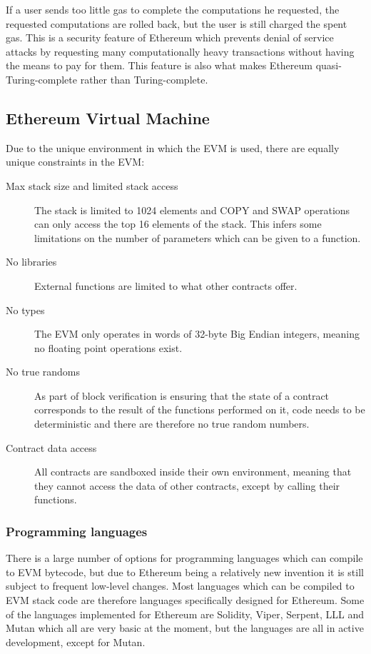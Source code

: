 \documentclass{article}
\begin{document}
		If a user sends too little gas to complete the computations he requested, the requested computations are rolled back, but the user is still charged the spent gas.
		This is a security feature of Ethereum which prevents denial of service attacks by requesting many computationally heavy transactions without having the means to pay for them. 
		This feature is also what makes Ethereum quasi-Turing-complete rather than Turing-complete.

		\subsection{Ethereum Virtual Machine}	
		\label{sec:ethereum-virtual-machine}
		Due to the unique environment in which the EVM is used, there are equally unique constraints in the EVM:
		\begin{description}
			\item [Max stack size and limited stack access] The stack is limited to 1024 elements and COPY and SWAP operations can only access the top 16 elements of the stack. This infers some limitations on the number of parameters which can be given to a function.
			\item [No libraries] External functions are limited to what other contracts offer.  
			\item [No types] The EVM only operates in words of 32-byte Big Endian integers, meaning no floating point operations exist.
			\item [No true randoms] As part of block verification is ensuring that the state of a contract corresponds to the result of the functions performed on it, code needs to be deterministic and there are therefore no true random numbers.
			\item [Contract data access] All contracts are sandboxed inside their own environment, meaning that they cannot access the data of other contracts, except by calling their functions.
		\end{description}

		\subsubsection{Programming languages}
		There is a large number of options for programming languages which can compile to EVM bytecode, but due to Ethereum being a relatively new invention it is still subject to frequent low-level changes. 
		Most languages which can be compiled to EVM stack code are therefore languages specifically designed for Ethereum.
		Some of the languages implemented for Ethereum are Solidity, Viper, Serpent, LLL and Mutan which all are very basic at the moment, but the languages are all in active development, except for Mutan.
\end{document}
